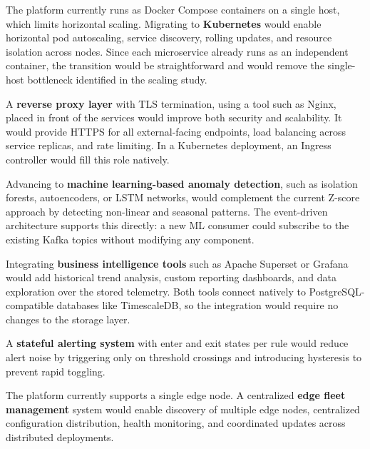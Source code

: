 The platform currently runs as Docker Compose containers on a single host, which limits horizontal scaling. Migrating to \textbf{Kubernetes} would enable horizontal pod autoscaling, service discovery, rolling updates, and resource isolation across nodes. Since each microservice already runs as an independent container, the transition would be straightforward and would remove the single-host bottleneck identified in the scaling study.

A \textbf{reverse proxy layer} with \gls{TLS} termination, using a tool such as Nginx, placed in front of the services would improve both security and scalability. It would provide \gls{HTTPS} for all external-facing endpoints, load balancing across service replicas, and rate limiting. In a Kubernetes deployment, an Ingress controller would fill this role natively.

Advancing to \textbf{machine learning-based anomaly detection}, such as isolation forests, autoencoders, or \gls{LSTM} networks, would complement the current Z-score approach by detecting non-linear and seasonal patterns. The event-driven architecture supports this directly: a new ML consumer could subscribe to the existing Kafka topics without modifying any component.

Integrating \textbf{business intelligence tools} such as Apache Superset or Grafana would add historical trend analysis, custom reporting dashboards, and data exploration over the stored telemetry. Both tools connect natively to PostgreSQL-compatible databases like TimescaleDB, so the integration would require no changes to the storage layer.

A \textbf{stateful alerting system} with enter and exit states per rule would reduce alert noise by triggering only on threshold crossings and introducing hysteresis to prevent rapid toggling.

The platform currently supports a single edge node. A centralized \textbf{edge fleet management} system would enable discovery of multiple edge nodes, centralized configuration distribution, health monitoring, and coordinated updates across distributed deployments.

